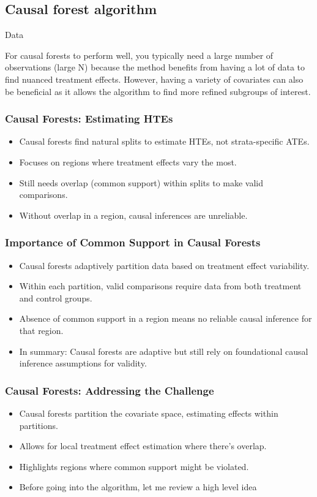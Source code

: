 \documentclass{beamer}
\begin{document}
\subsection{Causal forest algorithm}

\begin{frame}{Data}

For causal forests to perform well, you typically need a large number of observations (large N) because the method benefits from having a lot of data to find nuanced treatment effects. However, having a variety of covariates can also be beneficial as it allows the algorithm to find more refined subgroups of interest.

\end{frame}

\begin{frame}
\frametitle{Causal Forests: Estimating HTEs}
\begin{itemize}
\item Causal forests find natural splits to estimate HTEs, not strata-specific ATEs.
\item Focuses on regions where treatment effects vary the most.
\item Still needs overlap (common support) within splits to make valid comparisons.
\item Without overlap in a region, causal inferences are unreliable.
\end{itemize}
\end{frame}

\begin{frame}
\frametitle{Importance of Common Support in Causal Forests}
\begin{itemize}
\item Causal forests adaptively partition data based on treatment effect variability.
\item Within each partition, valid comparisons require data from both treatment and control groups.
\item Absence of common support in a region means no reliable causal inference for that region.
\item In summary: Causal forests are adaptive but still rely on foundational causal inference assumptions for validity.
\end{itemize}
\end{frame}




\begin{frame}
\frametitle{Causal Forests: Addressing the Challenge}
\begin{itemize}
    \item Causal forests partition the covariate space, estimating effects within partitions.
    \item Allows for local treatment effect estimation where there's overlap.
    \item Highlights regions where common support might be violated.
    \item Before going into the algorithm, let me review a high level idea
\end{itemize}
\end{frame}
\end{document}
